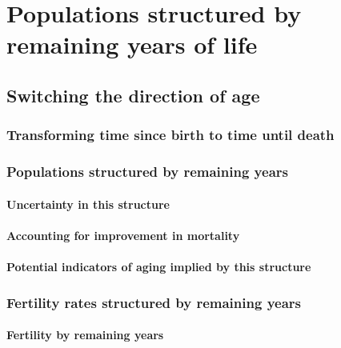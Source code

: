\part*{Populations structured by remaining years of life}
  \chapter{Switching the direction of age}
  
  
  \section{Transforming time since birth to time until death}
    
   
  \section{Populations structured by remaining years}
    
    \subsection{Uncertainty in this structure}
      
    \subsection{Accounting for improvement in mortality}
      
    \subsection{Potential indicators of aging implied by this structure}
      
  \section{Fertility rates structured by remaining years}
    
    
    \subsection{Fertility by remaining years}
      
      
